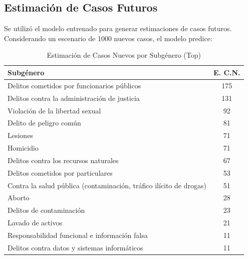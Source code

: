 \documentclass[conference]{IEEEtran}
\begin{document}
\subsection{Estimación de Casos Futuros}

Se utilizó el modelo entrenado para generar estimaciones de casos futuros. Considerando un escenario de 1000 nuevos casos, el modelo predice:
\begin{table}[htbp]
\caption{Estimación de Casos Nuevos por Subgénero (Top)}
\centering
\begin{tabular}{|l|c|}
\hline
\textbf{Subgénero} & \textbf{E. C.N.} \\
\hline
Delitos cometidos por funcionarios públicos & 175 \\
Delitos contra la administración de justicia & 131 \\
Violación de la libertad sexual & 92 \\
Delito de peligro común & 81 \\
Lesiones & 71 \\
Homicidio & 71 \\
Delitos contra los recursos naturales & 67 \\
Delitos cometidos por particulares & 53 \\
Contra la salud pública (contaminación, tráfico ilícito de drogas)& 51 \\
Aborto & 28 \\
Delitos de contaminación & 23 \\
Lavado de activos & 21 \\
Responsabilidad funcional e información falsa & 11 \\
Delitos contra datos y sistemas informáticos & 11 \\
\hline
\end{tabular}
\label{tab:estimacion_top}
\end{table}
\end{document}
